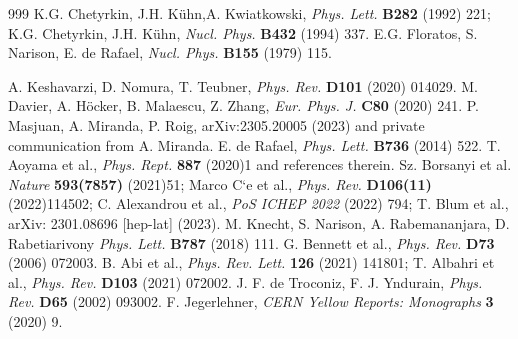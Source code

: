 \begin{thebibliography}{999}
 K.G. Chetyrkin, J.H. K\"uhn,A. Kwiatkowski, {\it Phys. Lett.} {\bf B282} (1992) 221; K.G. Chetyrkin, J.H. K\"uhn, {\it Nucl. Phys.} {\bf B432} (1994) 337.
E.G. Floratos, S. Narison, E. de Rafael, {\it Nucl. Phys.} {\bf B155} (1979) 115.

A. Keshavarzi, D. Nomura, T. Teubner, {\it Phys. Rev.} {\bf D101} (2020) 014029.
 M. Davier, A. H\"ocker, B. Malaescu,  Z. Zhang, {\it Eur. Phys. J.} {\bf C80} (2020) 241.
  P. Masjuan, A. Miranda, P. Roig, arXiv:2305.20005 (2023) and private communication from A. Miranda. 
  E. de Rafael, {\it Phys. Lett.} {\bf B736} (2014) 522.
 T. Aoyama et al., {\it  Phys. Rept.} {\bf 887} (2020)1 and references therein.
 Sz. Borsanyi et al. {\it  Nature} {\bf 593(7857)} (2021)51;  Marco C`e et al.,
{\it  Phys. Rev.} {\bf D106(11)} (2022)114502; C. Alexandrou et al., {\it PoS ICHEP 2022} (2022) 794; T. Blum et al., arXiv:  2301.08696 [hep-lat] (2023).
  M. Knecht, S. Narison, A. Rabemananjara, D. Rabetiarivony
 {\it Phys. Lett.} {\bf B787} (2018) 111.
  G. Bennett et al., {\it Phys. Rev.} {\bf D73} (2006) 072003.
    B. Abi et al., {\it Phys. Rev. Lett.} {\bf 126} (2021) 141801;  T. Albahri et al., {\it Phys. Rev.} {\bf  D103} (2021) 072002.
J. F. de Troconiz, F. J. Yndurain, {\it Phys. Rev.} {\bf D65} (2002) 093002.
 F. Jegerlehner, {\it CERN Yellow Reports: Monographs} {\bf 3} (2020) 9.
\end{thebibliography}



